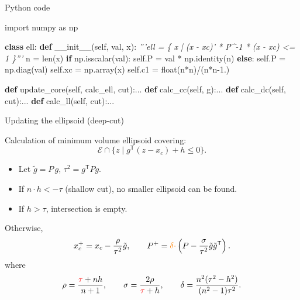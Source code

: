 \documentclass[
  ignorenonframetext,
  aspectratio=169,
  serif,onlymath]{beamer}
\newenvironment{Shaded}{}{}
\newcommand{\BuiltInTok}[1]{#1}
\newcommand{\CommentTok}[1]{\textcolor[rgb]{0.38,0.63,0.69}{\textit{#1}}}
\newcommand{\ControlFlowTok}[1]{\textcolor[rgb]{0.00,0.44,0.13}{\textbf{#1}}}
\newcommand{\FloatTok}[1]{\textcolor[rgb]{0.25,0.63,0.44}{#1}}
\newcommand{\FunctionTok}[1]{\textcolor[rgb]{0.02,0.16,0.49}{#1}}
\newcommand{\ImportTok}[1]{#1}
\newcommand{\KeywordTok}[1]{\textcolor[rgb]{0.00,0.44,0.13}{\textbf{#1}}}
\newcommand{\NormalTok}[1]{#1}
\newcommand{\OperatorTok}[1]{\textcolor[rgb]{0.40,0.40,0.40}{#1}}
\newcommand{\VariableTok}[1]{\textcolor[rgb]{0.10,0.09,0.49}{#1}}
\begin{document}
\begin{frame}[fragile]{Python code}
\protect\hypertarget{python-code}{}

\begin{Shaded}
\begin{Highlighting}[]
\ImportTok{import}\NormalTok{ numpy }\ImportTok{as}\NormalTok{ np}

\KeywordTok{class}\NormalTok{ ell:}
    \KeywordTok{def} \FunctionTok{__init__}\NormalTok{(}\VariableTok{self}\NormalTok{, val, x):}
        \CommentTok{'''ell = \{ x | (x - xc)' * P^-1 * (x - xc) <= 1 \}'''}
\NormalTok{        n }\OperatorTok{=} \BuiltInTok{len}\NormalTok{(x)}
        \ControlFlowTok{if}\NormalTok{ np.isscalar(val):}
            \VariableTok{self}\NormalTok{.P }\OperatorTok{=}\NormalTok{ val }\OperatorTok{*}\NormalTok{ np.identity(n)}
        \ControlFlowTok{else}\NormalTok{:}
            \VariableTok{self}\NormalTok{.P }\OperatorTok{=}\NormalTok{ np.diag(val)}
        \VariableTok{self}\NormalTok{.xc }\OperatorTok{=}\NormalTok{ np.array(x)}
        \VariableTok{self}\NormalTok{.c1 }\OperatorTok{=} \BuiltInTok{float}\NormalTok{(n}\OperatorTok{*}\NormalTok{n)}\OperatorTok{/}\NormalTok{(n}\OperatorTok{*}\NormalTok{n}\FloatTok{-1.}\NormalTok{)}

    \KeywordTok{def}\NormalTok{ update_core(}\VariableTok{self}\NormalTok{, calc_ell, cut):...}
    \KeywordTok{def}\NormalTok{ calc_cc(}\VariableTok{self}\NormalTok{, g):...}
    \KeywordTok{def}\NormalTok{ calc_dc(}\VariableTok{self}\NormalTok{, cut):...}
    \KeywordTok{def}\NormalTok{ calc_ll(}\VariableTok{self}\NormalTok{, cut):...}
\end{Highlighting}
\end{Shaded}

\end{frame}

\begin{frame}{Updating the ellipsoid (deep-cut)}
\protect\hypertarget{updating-the-ellipsoid-deep-cut}{}

Calculation of minimum volume ellipsoid covering:
\[ \mathcal{E} \cap \{z \mid g^\mathsf{T} (z - x_c) + h \leq 0 \}. \]

\begin{itemize}
\item
  Let \(\tilde{g} = P\,g\), \(\tau^2 = g^\mathsf{T} P g\).
\item
  If \(n \cdot h < -\tau\) (shallow cut), no smaller ellipsoid can be
  found.
\item
  If \(h > \tau\), intersection is empty.
\end{itemize}

Otherwise, \[x_c^+ = x_c - \frac{\rho}{ \tau^2 } \tilde{g}, \qquad
  P^+ = {\color{orange}\delta\cdot}\left(P - \frac{\sigma}{\tau^2} \tilde{g}\tilde{g}^\mathsf{T}\right). \]
where \[\rho = \frac{ {\color{red}\tau}+nh}{n+1}, \qquad
  \sigma = \frac{2\rho}{ {\color{red}\tau}+h}, \qquad
  \delta = \frac{n^2(\tau^2 - h^2)}{(n^2 - 1)\tau^2}. \]

\end{frame}
\end{document}
